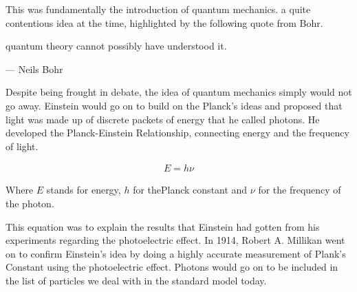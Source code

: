This was fundamentally the introduction of quantum mechanics.  a quite contentious idea at the time, highlighted by the following quote from Bohr.

quantum theory cannot possibly have understood it.

\begin{flushright}--- Neils Bohr\end{flushright}

Despite being frought in debate, the idea of quantum mechanics simply would not go away.
Einstein would go on to build on the Planck's ideas and proposed that light was made up of discrete packets of energy that he called photons.
He developed the Planck-Einstein Relationship, connecting  energy and the frequency of light.

\begin{align}
  E = h \nu
\end{align}

Where $E$ stands for energy, $h$ for thePlanck constant and $\nu$ for the frequency of the photon.


This equation was to explain the results that Einstein had gotten from his experiments regarding the photoelectric effect.
In 1914, Robert A. Millikan went on to confirm Einstein's idea by doing  a highly accurate measurement of Plank's Constant  using the photoelectric effect.
Photons would go on to be included in the list of particles we deal with in the standard model today.



